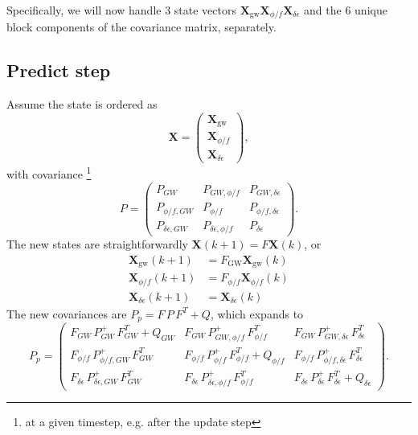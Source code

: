 \documentclass{tufte-handout} %
\begin{document}
Specifically, we will now handle 3 state vectors
 $\boldsymbol{X}_{\text{gw}}  \boldsymbol{X}_{\phi/f} \boldsymbol{X}_{\delta\epsilon}$ and the 6 unique block components of the covariance matrix, separately. 

\subsection{Predict step}
Assume the state is ordered as
\begin{equation}
	\boldsymbol{X}= \begin{pmatrix} \boldsymbol{X}_{\text{gw}} \\[1mm] \boldsymbol{X}_{\phi/f} \\[1mm] \boldsymbol{X}_{\delta\epsilon} \end{pmatrix},
\end{equation}
with covariance \footnote{at a given timestep, e.g. after the update step}
\begin{equation}
	P = \begin{pmatrix}
		P_{GW} & P_{GW,\phi/f} & P_{GW,\delta\epsilon}\\[1mm]
		P_{\phi/f,GW} & P_{\phi/f} & P_{\phi/f,\delta\epsilon}\\[1mm]
		P_{\delta\epsilon,GW} & P_{\delta\epsilon,\phi/f} & P_{\delta\epsilon}
	\end{pmatrix}.
\end{equation}
The new states are straightforwardly $\boldsymbol{X}(k+1) = F \boldsymbol{X}(k)$, or
\begin{align}
	 \boldsymbol{X}_{\text{gw}}(k+1) &= F_{\text{GW}} \boldsymbol{X}_{\text{gw}}(k) \\
	 	\boldsymbol{X}_{\phi/f}(k+1) &= F_{\phi / f} \boldsymbol{X}_{\phi/f}(k) \\
	 	 	 \boldsymbol{X}_{\delta\epsilon}(k+1) &=  \boldsymbol{X}_{\delta\epsilon}(k)
\end{align}
The new covariances are $P_p = F\,P\,F^T + Q$, which expands to
\begin{equation}
	P_p = \begin{pmatrix}
		F_{GW}\,P^+_{GW}\,F_{GW}^T + Q_{GW} & F_{GW}\,P^+_{GW,\phi/f}\,F_{\phi/f}^T & F_{GW}\,P^+_{GW,\delta\epsilon}\,F_{\delta\epsilon}^T\\[1mm]
		F_{\phi/f}\,P^+_{\phi/f,GW}\,F_{GW}^T & F_{\phi/f}\,P^+_{\phi/f}\,F_{\phi/f}^T + Q_{\phi/f} & F_{\phi/f}\,P^+_{\phi/f,\delta\epsilon}\,F_{\delta\epsilon}^T\\[1mm]
		F_{\delta\epsilon}\,P^+_{\delta\epsilon,GW}\,F_{GW}^T & F_{\delta\epsilon}\,P^+_{\delta\epsilon,\phi/f}\,F_{\phi/f}^T & F_{\delta\epsilon}\,P^+_{\delta\epsilon}\,F_{\delta\epsilon}^T + Q_{\delta\epsilon}
	\end{pmatrix}.
\end{equation}
\end{document}
